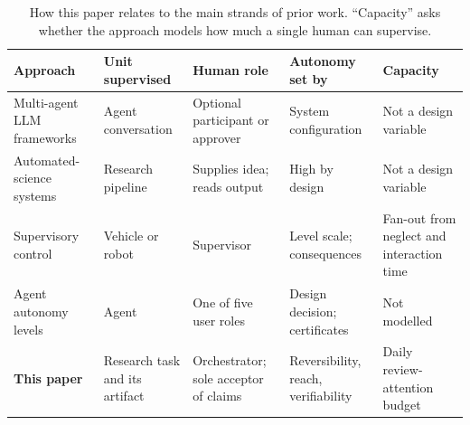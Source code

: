 \begin{table}[htbp]
  \centering
  \caption{How this paper relates to the main strands of prior work. ``Capacity'' asks
  whether the approach models how much a single human can supervise.}
  \label{tab:related}
  \small
  \begin{tabular}{L{3.0cm}L{2.5cm}L{2.7cm}L{2.5cm}L{2.6cm}}
    \toprule
    Approach & Unit supervised & Human role & Autonomy set by & Capacity \\
    \midrule
    Multi-agent LLM frameworks~\cite{wu2023autogen,hong2023metagpt,qian2024chatdev} &
      Agent conversation & Optional participant or approver & System configuration &
      Not a design variable \\
    Automated-science systems~\cite{lu2024aiscientist,schmidgall2025agentlab,gottweis2025coscientist} &
      Research pipeline & Supplies idea; reads output & High by design &
      Not a design variable \\
    Supervisory control~\cite{sheridan1978human,parasuraman2000model,crandall2005validating} &
      Vehicle or robot & Supervisor & Level scale; consequences & Fan-out from neglect and interaction time \\
    Agent autonomy levels~\cite{feng2025levels} &
      Agent & One of five user roles & Design decision; certificates & Not modelled \\
    \textbf{This paper} &
      Research task and its artifact & Orchestrator; sole acceptor of claims &
      Reversibility, reach, verifiability & Daily review-attention budget \\
    \bottomrule
  \end{tabular}
\end{table}

